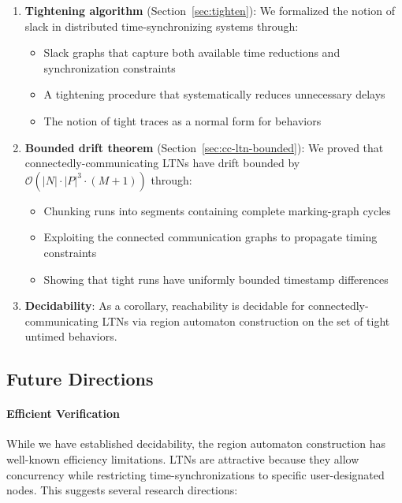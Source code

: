 \begin{enumerate}
\item \textbf{Tightening algorithm} (Section~\ref{sec:tighten}): We formalized the notion of slack in distributed time-synchronizing systems through:
  \begin{itemize}
  \item Slack graphs that capture both available time reductions and synchronization constraints
  \item A tightening procedure that systematically reduces unnecessary delays
  \item The notion of tight traces as a normal form for behaviors
  \end{itemize}

\item \textbf{Bounded drift theorem} (Section~\ref{sec:cc-ltn-bounded}): We proved that connectedly-communicating LTNs have drift bounded by $\mathcal{O}(|N| \cdot |P|^3 \cdot (M+1))$ through:
  \begin{itemize}
  \item Chunking runs into segments containing complete marking-graph cycles
  \item Exploiting the connected communication graphs to propagate timing constraints
  \item Showing that tight runs have uniformly bounded timestamp differences
  \end{itemize}

\item \textbf{Decidability}: As a corollary, reachability is decidable for connectedly-communicating LTNs via region automaton construction on the set of tight untimed behaviors.
\end{enumerate}

\subsection{Future Directions}

\paragraph*{Efficient Verification}

While we have established decidability, the region automaton construction has well-known efficiency limitations. LTNs are attractive because they allow concurrency while restricting time-synchronizations to specific user-designated nodes. This suggests several research directions:

